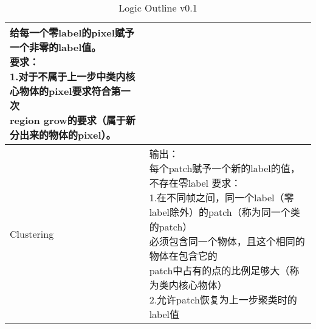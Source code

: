 \begin{table*}[!hbp]
\begin{tabular}{p{}|p{}}
{			给每一个零label的pixel赋予一个非零的label值。\\
			要求：\\
			1.对于不属于上一步中类内核心物体的pixel要求符合第一次\\region grow的要求（属于新分出来的物体的pixel）。}\\
		\hline
		Clustering&\tabincell{l}{输出：\\
			每个patch赋予一个新的label的值，不存在零label
			要求：\\
			1.在不同帧之间，同一个label（零label除外）的patch（称为同一个类的patch）\\必须包含同一个物体，且这个相同的物体在包含它的\\patch中占有的点的比例足够大（称为类内核心物体）\\
			2.允许patch恢复为上一步聚类时的label值}\\
		\hline
	\end{tabular}
	\caption{Logic Outline v0.1} %
	\label{tab:logic_outline01}
\end{table*}